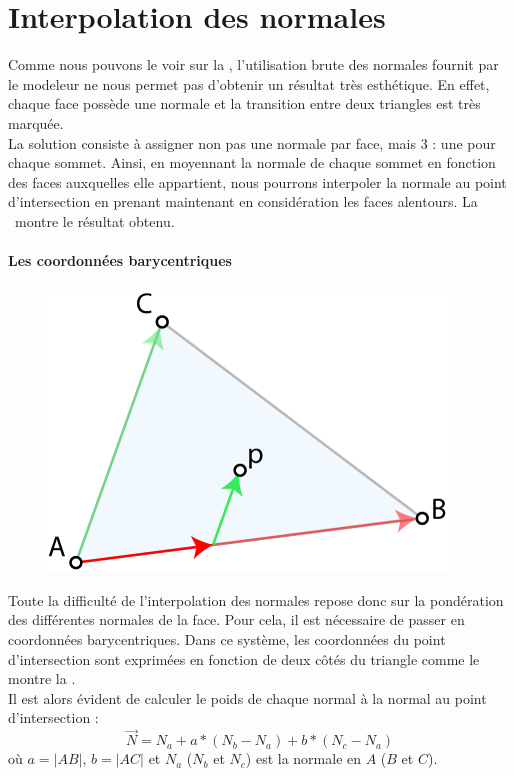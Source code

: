 \section{Interpolation des normales}
Comme nous pouvons le voir sur la , l'utilisation
brute des
normales fournit par le modeleur ne nous permet pas d'obtenir un résultat très
esthétique. En effet, chaque face possède une normale et la transition entre
deux triangles est très marquée.\\

La solution consiste à assigner non pas une normale par face, mais 3 : une
pour chaque sommet. Ainsi, en moyennant la normale de chaque sommet en
fonction des faces auxquelles elle appartient, nous pourrons interpoler la
normale au point d'intersection en prenant maintenant en considération les
faces alentours. La \ montre le résultat
obtenu.

\paragraph{Les coordonnées barycentriques}
\begin{figure}
  \includegraphics[width=.4\textwidth,
  keepaspectratio=true]{img/barycentricCoordinates}
  \label{fig:barycentric}
\end{figure}
Toute la difficulté de l'interpolation des normales repose donc sur la
pondération des différentes normales de la face. Pour cela, il est nécessaire
de passer en coordonnées barycentriques. Dans ce système, les coordonnées du
point d'intersection sont exprimées en fonction de deux côtés du triangle
comme le montre la .\\

Il est alors évident de calculer le poids de chaque normal à la normal au
point d'intersection :
$$\vec{N} = N_a + a * (N_b - N_a) + b * (N_c - N_a)$$
où $a = |AB|$, $b = |AC|$ et $N_a$ (\resp $N_b$ et $N_c$) est la normale en
$A$ (\resp $B$ et $C$).

